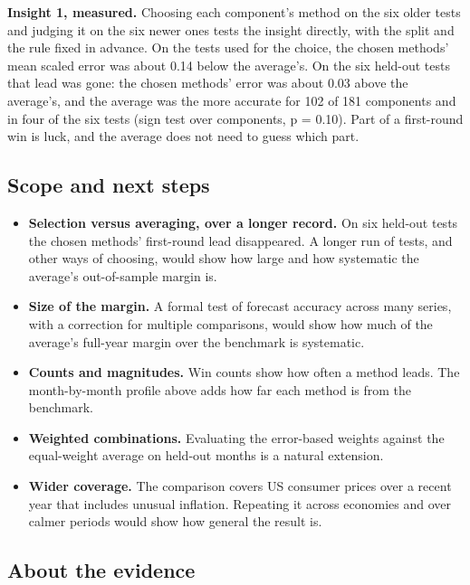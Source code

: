 \documentclass[
  british,
  a4paper,
]{article}
\providecommand{\tightlist}{%
  \setlength{\itemsep}{0pt}\setlength{\parskip}{0pt}}
\begin{document}
\textbf{Insight 1, measured.} Choosing each component's method on the
six older tests and judging it on the six newer ones tests the insight
directly, with the split and the rule fixed in advance. On the tests
used for the choice, the chosen methods' mean scaled error was about
0.14 below the average's. On the six held-out tests that lead was gone:
the chosen methods' error was about 0.03 above the average's, and the
average was the more accurate for 102 of 181 components and in four of
the six tests (sign test over components, p = 0.10). Part of a
first-round win is luck, and the average does not need to guess which
part.

\subsection{Scope and next steps}\label{scope-and-next-steps}

\begin{itemize}
\tightlist
\item
  \textbf{Selection versus averaging, over a longer record.} On six
  held-out tests the chosen methods' first-round lead disappeared. A
  longer run of tests, and other ways of choosing, would show how large
  and how systematic the average's out-of-sample margin is.
\item
  \textbf{Size of the margin.} A formal test of forecast accuracy across
  many series, with a correction for multiple comparisons, would show
  how much of the average's full-year margin over the benchmark is
  systematic.
\item
  \textbf{Counts and magnitudes.} Win counts show how often a method
  leads. The month-by-month profile above adds how far each method is
  from the benchmark.
\item
  \textbf{Weighted combinations.} Evaluating the error-based weights
  against the equal-weight average on held-out months is a natural
  extension.
\item
  \textbf{Wider coverage.} The comparison covers US consumer prices over
  a recent year that includes unusual inflation. Repeating it across
  economies and over calmer periods would show how general the result
  is.
\end{itemize}

\subsection{About the evidence}\label{about-the-evidence}
\end{document}
